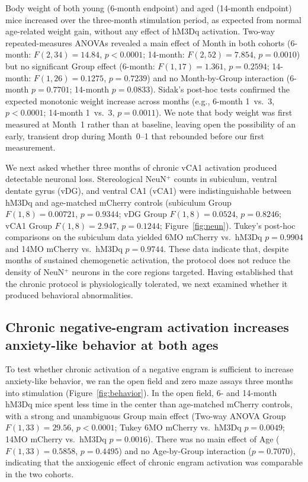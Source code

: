 \documentclass[11pt]{article}
\begin{document}
Body weight of both young (6-month endpoint) and aged (14-month endpoint) mice increased over the three-month stimulation period, as expected from normal age-related weight gain, without any effect of hM3Dq activation. Two-way repeated-measures ANOVAs revealed a main effect of Month in both cohorts (6-month: $F(2,34)=14.84$, $p<0.0001$; 14-month: $F(2,52)=7.854$, $p=0.0010$) but no significant Group effect (6-month: $F(1,17)=1.361$, $p=0.2594$; 14-month: $F(1,26)=0.1275$, $p=0.7239$) and no Month-by-Group interaction (6-month $p=0.7701$; 14-month $p=0.0833$). Sidak's post-hoc tests confirmed the expected monotonic weight increase across months (e.g., 6-month 1~vs.~3, $p<0.0001$; 14-month 1~vs.~3, $p=0.0011$). We note that body weight was first measured at Month~1 rather than at baseline, leaving open the possibility of an early, transient drop during Month~0--1 that rebounded before our first measurement.

We next asked whether three months of chronic vCA1 activation produced detectable neuronal loss. Stereological NeuN$^{+}$ counts in subiculum, ventral dentate gyrus (vDG), and ventral CA1 (vCA1) were indistinguishable between hM3Dq and age-matched mCherry controls (subiculum Group $F(1,8)=0.00721$, $p=0.9344$; vDG Group $F(1,8)=0.0524$, $p=0.8246$; vCA1 Group $F(1,8)=2.947$, $p=0.1244$; Figure~\ref{fig:neun}). Tukey's post-hoc comparisons on the subiculum data yielded 6MO mCherry vs.~hM3Dq $p=0.9904$ and 14MO mCherry vs.~hM3Dq $p=0.9744$. These data indicate that, despite months of sustained chemogenetic activation, the protocol does not reduce the density of NeuN$^{+}$ neurons in the core regions targeted. Having established that the chronic protocol is physiologically tolerated, we next examined whether it produced behavioral abnormalities.

\subsection{Chronic negative-engram activation increases anxiety-like behavior at both ages}

To test whether chronic activation of a negative engram is sufficient to increase anxiety-like behavior, we ran the open field and zero maze assays three months into stimulation (Figure~\ref{fig:behavior}). In the open field, 6- and 14-month hM3Dq mice spent less time in the center than age-matched mCherry controls, with a strong and unambiguous Group main effect (Two-way ANOVA Group $F(1,33)=29.56$, $p<0.0001$; Tukey 6MO mCherry vs.~hM3Dq $p=0.0049$; 14MO mCherry vs.~hM3Dq $p=0.0016$). There was no main effect of Age ($F(1,33)=0.5858$, $p=0.4495$) and no Age-by-Group interaction ($p=0.7070$), indicating that the anxiogenic effect of chronic engram activation was comparable in the two cohorts.
\end{document}
